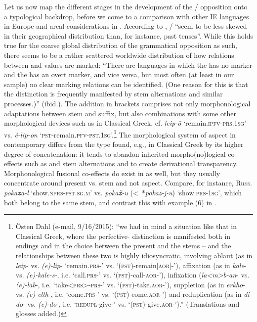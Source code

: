 \documentclass[output=paper]{langsci/langscibook}
\begin{document}
Let us now map the different stages in the development of the  / opposition onto a typological backdrop, before we come to a comparison with other IE languages in Europe and areal considerations in .
According to \citet{wals-65}%
, /  “seem to be less skewed in their geographical distribution than, for instance, past tenses”. 
While this holds true for the coarse global distribution of the grammatical opposition as such, there seems to be a rather scattered worldwide distribution of how relations between  and  values are marked: “There are languages in which the  has no marker and the  has an overt marker, and vice versa, but most often (at least in our sample) no clear marking relations can be identified. (One reason for this is that the distinction is frequently manifested by stem alternations and similar processes.)” (ibid.). The addition in brackets comprises not only morphonological adaptations between stem and suffix, but also combinations with some other morphological devices such as  in Classical Greek, cf. \textit{leip-\=o} ‘remain.\textsc{ipfv}-\textsc{prs.1sg}’ vs. \textit{é-lip-on} ‘\textsc{pst}-remain.\textsc{pfv-pst.1sg}’.\footnote{Östen Dahl (e-mail, 9/16/2015): “we had in mind a situation like that in Classical Greek, where the perfective- distinction is manifested both in endings and in the choice between the present and the  stems – and the relationships between these two is highly idiosyncratic, involving ablaut (as in \textit{leip}- vs. \textit{(e)-lip}- ‘remain.\textsc{prs}-’ vs. ‘(\textsc{pst)}-remain[\textsc{aor]-}’), affixation (as in \textit{kale}- vs. \textit{(e)-kale-s-}, i.e. ‘call.\textsc{prs}-’ vs. ‘(\textsc{pst)}-call-\textsc{aor-}’), infixation (\textit{la<m{\textgreater}b-an}- vs. \textit{(e)-lab}-, i.e. ‘take<\textsc{prs}{\textgreater}-\textsc{prs}-’ vs. ‘(\textsc{pst)}-take.\textsc{aor-}’), suppletion (as in \textit{erkho}- vs. \textit{(e)-elth}-, i.e. ‘come.\textsc{prs}-’ vs. ‘(\textsc{pst)}-come.\textsc{aor-}’) and reduplication (as in \textit{di-do}- vs. \textit{(e)-do}-, i.e. ‘\textsc{redupl}-give-’ vs. ‘(\textsc{pst)}-give.\textsc{aor-}’).” (Translations and glosses added.)}  The morphological system of aspect in contemporary  differs from the type found, e.g., in Classical Greek by its higher degree of concatenation: it tends to abandon inherited morpho(no)logical co-effects such as  and stem alternations and to create derivational transparency. Morphonological fusional co-effects do exist in  as well, but they usually concentrate around present vs.  stem  and not aspect. Compare, for instance, Russ. \textit{poka\textbf{{z}}a-l} ‘show.\textsc{nprs-pst.sg.m}’ vs. \textit{poka\textbf{{ž}}-u} (<~*\textit{pokaz-j-u}) ‘show.\textsc{prs-1sg}’, which both belong to the same  stem, and contrast this with example (6) in .
\end{document}
